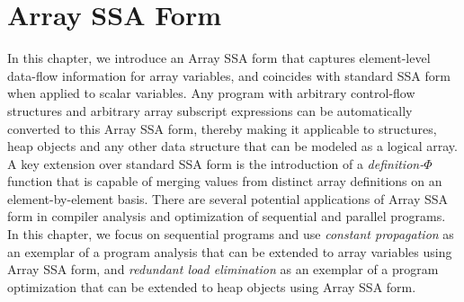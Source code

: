 \chapter{Array SSA Form }
\label{chapter:array_ssa}
{}

\label{sec:intro}
In this chapter,
we introduce an Array SSA form 
that captures element-level data-flow information for array variables, and
coincides with standard SSA form when applied to scalar variables.  
Any program with arbitrary control-flow structures and arbitrary array
subscript expressions can be automatically converted to this 
Array SSA form, thereby making it applicable to structures, heap
objects and any other data structure
that can be modeled as a logical array.
A key extension over standard SSA form is the introduction of a
{\em definition-$\Phi$} function that is capable of
merging values from distinct array definitions on an element-by-element
basis. 
There are several potential applications of Array SSA form in compiler
analysis
and optimization of sequential and parallel programs.
In this chapter, we focus on sequential programs and use
{\em constant propagation}
as an exemplar of a program analysis that can be extended to array variables
using Array SSA form, and {\em redundant load elimination} as an
exemplar  of a program optimization that can be extended to heap objects using Array SSA form.

